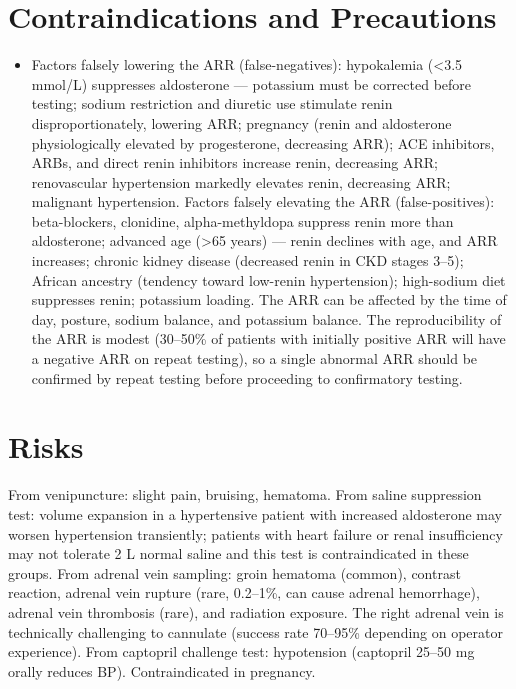 \section*{Contraindications and Precautions}
\begin{itemize}
  \item Factors falsely lowering the ARR (false-negatives): hypokalemia (<3.5 mmol/L) suppresses aldosterone --- potassium must be corrected before testing; sodium restriction and diuretic use stimulate renin disproportionately, lowering ARR; pregnancy (renin and aldosterone physiologically elevated by progesterone, decreasing ARR); ACE inhibitors, ARBs, and direct renin inhibitors increase renin, decreasing ARR; renovascular hypertension markedly elevates renin, decreasing ARR; malignant hypertension. Factors falsely elevating the ARR (false-positives): beta-blockers, clonidine, alpha-methyldopa suppress renin more than aldosterone; advanced age (>65 years) --- renin declines with age, and ARR increases; chronic kidney disease (decreased renin in CKD stages 3--5); African ancestry (tendency toward low-renin hypertension); high-sodium diet suppresses renin; potassium loading. The ARR can be affected by the time of day, posture, sodium balance, and potassium balance. The reproducibility of the ARR is modest (30--50\% of patients with initially positive ARR will have a negative ARR on repeat testing), so a single abnormal ARR should be confirmed by repeat testing before proceeding to confirmatory testing.
\end{itemize}
\section*{Risks}
From venipuncture: slight pain, bruising, hematoma. From saline suppression test: volume expansion in a hypertensive patient with increased aldosterone may worsen hypertension transiently; patients with heart failure or renal insufficiency may not tolerate 2 L normal saline and this test is contraindicated in these groups. From adrenal vein sampling: groin hematoma (common), contrast reaction, adrenal vein rupture (rare, 0.2--1\%, can cause adrenal hemorrhage), adrenal vein thrombosis (rare), and radiation exposure. The right adrenal vein is technically challenging to cannulate (success rate 70--95\% depending on operator experience). From captopril challenge test: hypotension (captopril 25--50 mg orally reduces BP). Contraindicated in pregnancy.

